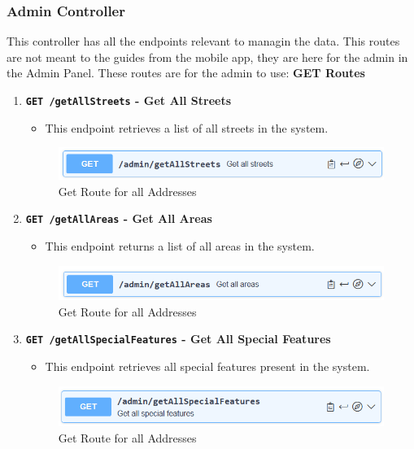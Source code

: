     \subsubsection{Admin Controller}
    This controller has all the endpoints relevant to managin the data. This routes are not meant to the guides from the mobile app, they are here for the admin in the Admin Panel. These routes are for the admin to use: \newline \newline
    \textbf{GET Routes}
    \begin{enumerate}
        \item \textbf{\texttt{GET /getAllStreets} - Get All Streets}
        \begin{itemize}
            \item This endpoint retrieves a list of all streets in the system.
        \end{itemize} 
        \begin{figure} [H]
            \centering
            \includegraphics [width=1\textwidth] {images/andreas/praxis/getAllStreets.png}
            \caption{Get Route for all Addresses}
        \end{figure}

        \item \textbf{\texttt{GET /getAllAreas} - Get All Areas}
        \begin{itemize}
            \item This endpoint returns a list of all areas in the system.
        \end{itemize} 
        \begin{figure} [H]
            \centering
            \includegraphics [width=1\textwidth] {images/andreas/praxis/getAllAreas.png}
            \caption{Get Route for all Addresses}
        \end{figure}

        \item \textbf{\texttt{GET /getAllSpecialFeatures} - Get All Special Features}
        \begin{itemize}
            \item This endpoint retrieves all special features present in the system.
        \end{itemize} 
        \begin{figure} [H]
            \centering
            \includegraphics [width=1\textwidth] {images/andreas/praxis/getAllSF.png}
            \caption{Get Route for all Addresses}
        \end{figure}
    \end{enumerate}

